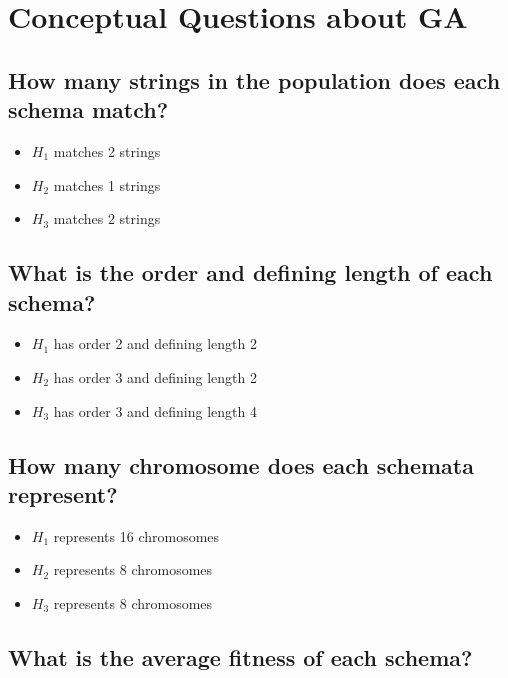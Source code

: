\section{Conceptual Questions about GA}

\subsection{How many strings in the population does each schema match?}

\begin{itemize}
    \item \(H_1\) matches 2 strings
    \item \(H_2\) matches 1 strings
    \item \(H_3\) matches 2 strings
\end{itemize}

\subsection{What is the order and defining length of each schema?}

\begin{itemize}
    \item \(H_1\) has order 2 and defining length 2
    \item \(H_2\) has order 3 and defining length 2
    \item \(H_3\) has order 3 and defining length 4
\end{itemize}

\subsection{How many chromosome does each schemata represent?}

\begin{itemize}
    \item \(H_1\) represents 16 chromosomes
    \item \(H_2\) represents 8 chromosomes
    \item \(H_3\) represents 8 chromosomes
\end{itemize}

\subsection{What is the average fitness of each schema?}

